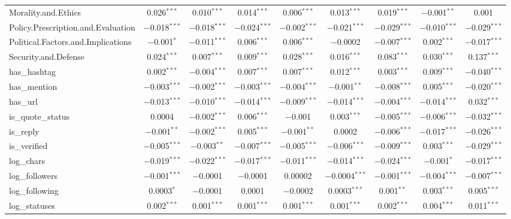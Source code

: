 \begin{table}[!htbp]
\begin{tabular}{@{\extracolsep{5pt}}lcccccccc}
  Morality.and.Ethics & 0.026$^{***}$ & 0.010$^{***}$ & 0.014$^{***}$ & 0.006$^{***}$ & 0.013$^{***}$ & 0.019$^{***}$ & $-$0.001$^{**}$ & 0.001 \\ 
  Policy.Prescription.and.Evaluation & $-$0.018$^{***}$ & $-$0.018$^{***}$ & $-$0.024$^{***}$ & $-$0.002$^{***}$ & $-$0.021$^{***}$ & $-$0.029$^{***}$ & $-$0.010$^{***}$ & $-$0.029$^{***}$ \\ 
  Political.Factors.and.Implications & $-$0.001$^{*}$ & $-$0.011$^{***}$ & 0.006$^{***}$ & 0.006$^{***}$ & $-$0.0002 & $-$0.007$^{***}$ & 0.002$^{***}$ & $-$0.017$^{***}$ \\ 
  Security.and.Defense & 0.024$^{***}$ & 0.007$^{***}$ & 0.009$^{***}$ & 0.028$^{***}$ & 0.016$^{***}$ & 0.083$^{***}$ & 0.030$^{***}$ & 0.137$^{***}$ \\ 
  has\_hashtag & 0.002$^{***}$ & $-$0.004$^{***}$ & 0.007$^{***}$ & 0.007$^{***}$ & 0.012$^{***}$ & 0.003$^{***}$ & 0.009$^{***}$ & $-$0.040$^{***}$ \\ 
  has\_mention & $-$0.003$^{***}$ & $-$0.002$^{***}$ & $-$0.003$^{***}$ & $-$0.004$^{***}$ & $-$0.001$^{**}$ & $-$0.008$^{***}$ & 0.005$^{***}$ & $-$0.020$^{***}$ \\ 
  has\_url & $-$0.013$^{***}$ & $-$0.010$^{***}$ & $-$0.014$^{***}$ & $-$0.009$^{***}$ & $-$0.014$^{***}$ & $-$0.004$^{***}$ & $-$0.014$^{***}$ & 0.032$^{***}$ \\ 
  is\_quote\_status & 0.0004 & $-$0.002$^{***}$ & 0.006$^{***}$ & $-$0.001 & 0.003$^{***}$ & $-$0.005$^{***}$ & $-$0.006$^{***}$ & $-$0.032$^{***}$ \\ 
  is\_reply & $-$0.001$^{**}$ & $-$0.002$^{***}$ & 0.005$^{***}$ & $-$0.001$^{**}$ & 0.0002 & $-$0.006$^{***}$ & $-$0.017$^{***}$ & $-$0.026$^{***}$ \\ 
  is\_verified & $-$0.005$^{***}$ & $-$0.003$^{**}$ & $-$0.007$^{***}$ & $-$0.005$^{***}$ & $-$0.006$^{***}$ & $-$0.009$^{***}$ & 0.003$^{***}$ & $-$0.029$^{***}$ \\ 
  log\_chars & $-$0.019$^{***}$ & $-$0.022$^{***}$ & $-$0.017$^{***}$ & $-$0.011$^{***}$ & $-$0.014$^{***}$ & $-$0.024$^{***}$ & $-$0.001$^{*}$ & $-$0.017$^{***}$ \\ 
  log\_followers & $-$0.001$^{***}$ & $-$0.0001 & $-$0.0001 & 0.00002 & $-$0.0004$^{***}$ & $-$0.001$^{***}$ & $-$0.004$^{***}$ & $-$0.007$^{***}$ \\ 
  log\_following & 0.0003$^{*}$ & $-$0.0001 & 0.0001 & $-$0.0002 & 0.0003$^{***}$ & 0.001$^{**}$ & 0.003$^{***}$ & 0.005$^{***}$ \\ 
  log\_statuses & 0.002$^{***}$ & 0.001$^{***}$ & 0.001$^{***}$ & 0.001$^{***}$ & 0.001$^{***}$ & 0.002$^{***}$ & 0.004$^{***}$ & 0.011$^{***}$ \\ 

\end{tabular}
\end{table}
